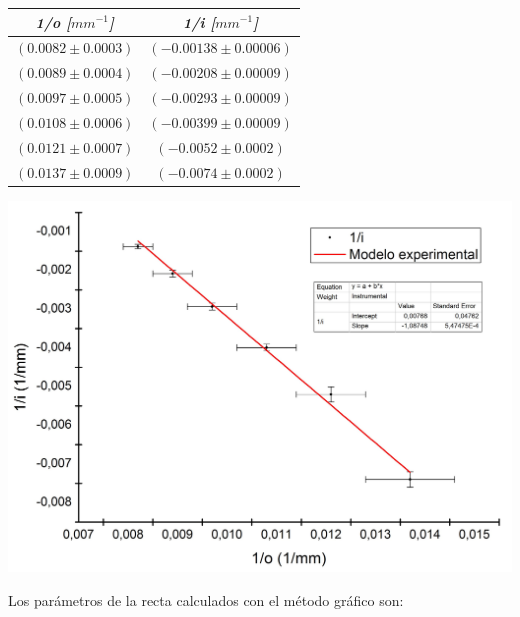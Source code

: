 \documentclass[a4paper,12pt]{article}
\newenvironment{Figure}
  {\par\medskip\noindent\minipage{\linewidth}}
  {\endminipage\par\medskip}
\begin{document}
\begin{multicols*}{2}
\begin{Figure}
            \begin{tabular}{cc}
                \toprule
                \textit{\textbf{1/o [$mm^{-1}$]}} & \textit{\textbf{1/i [$mm^{-1}$]}} \\
                \midrule
                $(0.0082 \pm 0.0003)$ & $(-0.00138 \pm 0.00006)$ \\
                $(0.0089 \pm 0.0004)$ & $(-0.00208 \pm 0.00009)$ \\
                $(0.0097 \pm 0.0005)$ & $(-0.00293 \pm 0.00009)$ \\
                $(0.0108 \pm 0.0006)$ & $(-0.00399 \pm 0.00009)$ \\
                $(0.0121 \pm 0.0007)$ & $(-0.0052 \pm 0.0002)$ \\
                $(0.0137 \pm 0.0009)$ & $(-0.0074 \pm 0.0002)$ \\
                \bottomrule 
            \end{tabular}

            \label{tab:Datosdiverinv}
        \end{Figure}

        \begin{Figure}
            \centering
            \includegraphics[width=1\linewidth]{LenteDivergente.jpg}
            \label{fig:Lentediv}
        \end{Figure}

        Los parámetros de la recta calculados con el método gráfico son: 


\end{multicols*}
\end{document}
